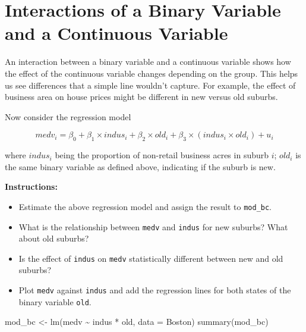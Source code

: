 \documentclass[
  12pt,
  letterpaper,
]{scrbook}
\newenvironment{Shaded}{\begin{snugshade}}{\end{snugshade}}
\newcommand{\AttributeTok}[1]{\textcolor[rgb]{0.40,0.45,0.13}{#1}}
\newcommand{\FunctionTok}[1]{\textcolor[rgb]{0.28,0.35,0.67}{#1}}
\newcommand{\NormalTok}[1]{\textcolor[rgb]{0.00,0.23,0.31}{#1}}
\newcommand{\OtherTok}[1]{\textcolor[rgb]{0.00,0.23,0.31}{#1}}
\newcommand{\SpecialCharTok}[1]{\textcolor[rgb]{0.37,0.37,0.37}{#1}}
\providecommand{\tightlist}{%
  \setlength{\itemsep}{0pt}\setlength{\parskip}{0pt}}
\renewcommand{\tightlist}{\setlength{\itemsep}{0.5\baselineskip}\setlength{\parskip}{0.2\baselineskip}}
\theoremstyle{definition}
\theoremstyle{plain}
\theoremstyle{remark}
\begin{document}
\section{Interactions of a Binary Variable and a Continuous
Variable}\label{interactions-of-a-binary-variable-and-a-continuous-variable}

An interaction between a binary variable and a continuous variable shows
how the effect of the continuous variable changes depending on the
group. This helps us see differences that a simple line wouldn't
capture. For example, the effect of business area on house prices might
be different in new versus old suburbs.

Now consider the regression model

\[
medv_i = \beta_0 + \beta_1 \times indus_i + \beta_2 \times old_i + \beta_3 \times (indus_i\times old_i) + u_i
\]

where \(indus_i\) being the proportion of non-retail business acres in
suburb \(i\); \(old_i\) is the same binary variable as defined above,
indicating if the suburb is new.

\textbf{Instructions:}

\begin{itemize}
\tightlist
\item
  Estimate the above regression model and assign the result to
  \texttt{mod\_bc}.
\item
  What is the relationship between \texttt{medv} and \texttt{indus} for
  new suburbs? What about old suburbs?
\item
  Is the effect of \texttt{indus} on \texttt{medv} statistically
  different between new and old suburbs?
\item
  Plot \texttt{medv} against \texttt{indus} and add the regression lines
  for both states of the binary variable \texttt{old}.
\end{itemize}

\begin{Shaded}
\begin{Highlighting}[]
\NormalTok{mod\_bc }\OtherTok{\textless{}{-}} \FunctionTok{lm}\NormalTok{(medv }\SpecialCharTok{\textasciitilde{}}\NormalTok{ indus }\SpecialCharTok{*}\NormalTok{ old, }\AttributeTok{data =}\NormalTok{ Boston)}
\FunctionTok{summary}\NormalTok{(mod\_bc)}
\end{Highlighting}
\end{Shaded}
\end{document}
